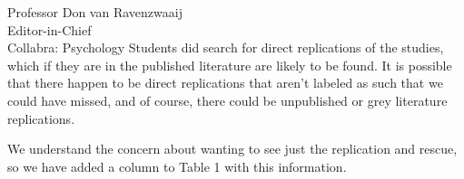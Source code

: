 \documentclass{stanfordletter}
\begin{document}
\begin{letter}{Professor Don van Ravenzwaaij \\ Editor-in-Chief \\ Collabra: Psychology }
	Students did search for direct replications of the studies, which if they are in the published literature are likely to be found. It is possible that there happen to be direct replications that aren't labeled as such that we could have missed, and of course, there could be unpublished or grey literature replications. 
	
	We understand the concern about wanting to see just the replication and rescue, so we have added a column to Table 1 with this information.
	
	
	

\end{letter}
\end{document}
